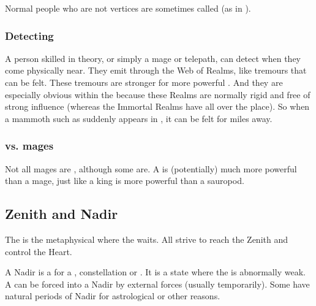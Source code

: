 Normal people who are not vertices are sometimes called  (as in ). 





\subsubsection{Detecting \vertices}
A person skilled in \nexus{} theory, or simply a mage or telepath, can detect \vertices{} when they come physically near. 
They emit  through the Web of Realms, like tremours that can be felt. 
These tremours are stronger for more powerful \vertices. 
And they are especially obvious within the  because these Realms are normally rigid and free of strong \vertex{} influence (whereas the Immortal Realms have \vertices{} all over the place). 
So when a mammoth \vertex{} such as \QuessanthIshnaruchaefir{} suddenly appears in \Azmith, it can be felt for miles away. 





\subsubsection{\Vertices vs. mages}
Not all mages are \vertices, although some are. 
A \vertex{} is (potentially) much more powerful than a mage, just like a king is more powerful than a sauropod. 









\subsection{Zenith and Nadir}
The  is the metaphysical  where the  waits. 
All \nexuses{} strive to reach the Zenith and control the Heart. 

A Nadir is a  for a \nexus{}, constellation or \vertex. 
It is a state where the \nexus{} is abnormally weak. 
A \nexus{} can be forced into a Nadir by external forces (usually temporarily). 
Some \nexuses{} have natural periods of Nadir for astrological or other reasons. 















